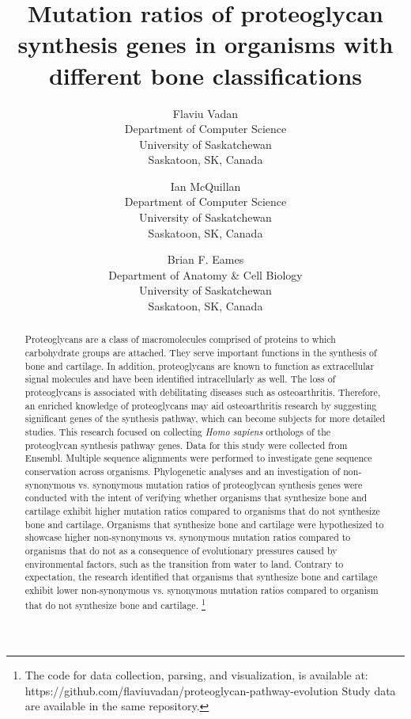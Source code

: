 \documentclass{article}
\title{Mutation ratios of proteoglycan synthesis genes in organisms with different bone classifications}
\author{
    	Flaviu Vadan \\
    	\small{Department of Computer Science} \\
	\small{University of Saskatchewan} \\
    	\small{Saskatoon, SK, Canada}
    	\and
    	Ian McQuillan \\
    	\small{Department of Computer Science} \\
	\small{University of Saskatchewan} \\
	\small{Saskatoon, SK, Canada}
	\and
	Brian F. Eames \\
	\small{Department of Anatomy \& Cell Biology} \\
	\small{University of Saskatchewan} \\
	\small{Saskatoon, SK, Canada}
}
\begin{document}
\maketitle

\begin{abstract}
Proteoglycans are a class of macromolecules comprised of proteins to which carbohydrate groups are attached. They serve important functions in the synthesis of bone and cartilage. In addition, proteoglycans are known to function as extracellular signal molecules and have been identified intracellularly as well. The loss of proteoglycans is associated with debilitating diseases such as osteoarthritis. Therefore, an enriched knowledge of proteoglycans may aid osteoarthritis research by suggesting significant genes of the synthesis pathway, which can become subjects for more detailed studies. This research focused on collecting \textit{Homo sapiens} orthologs of the proteoglycan synthesis pathway genes. Data for this study were collected from Ensembl. Multiple sequence alignments were performed to investigate gene sequence conservation across organisms. Phylogenetic analyses and an investigation of non-synonymous vs. synonymous mutation ratios of proteoglycan synthesis genes were conducted with the intent of verifying whether organisms that synthesize bone and cartilage exhibit higher mutation ratios compared to organisms that do not synthesize bone and cartilage. Organisms that synthesize bone and cartilage were hypothesized to showcase higher non-synonymous vs. synonymous mutation ratios compared to organisms that do not as a consequence of evolutionary pressures caused by environmental factors, such as the transition from water to land. Contrary to expectation, the research identified that organisms that synthesize bone and cartilage exhibit lower non-synonymous vs. synonymous mutation ratios compared to organism that do not synthesize bone and cartilage. \footnote{The code for data collection, parsing, and visualization, is available at: https://github.com/flaviuvadan/proteoglycan-pathway-evolution Study data are available in the same repository.}
\end{abstract}

\newpage
\end{document}
